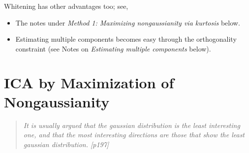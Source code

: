\documentclass[a4paper, one	side]{book}
\begin{document}
\begin{itemize}
Whitening has other advantages too; see, \eg
	\begin{itemize}
	\item The notes under \textit{Method 1: Maximizing nongaussianity via kurtosis} below.
	\item Estimating multiple components becomes easy through the orthogonality constraint (see Notes on \textit{Estimating multiple components} below).
	\end{itemize}
\end{itemize}


\chapter{ICA by Maximization of Nongaussianity}


\begin{quotation}
\em It is usually argued that the gaussian distribution is the least interesting one, and that the most interesting directions are those that show the least gaussian distribution. [p197]
\end{quotation}
\end{document}

